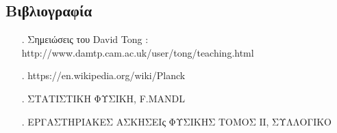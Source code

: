 \documentclass[a4paper]{article}
\begin{document}
\subsection*{Βιβλιογραφία}
\begin{itemize}
\item[.] Σημειώσεις του David Tong : http://www.damtp.cam.ac.uk/user/tong/teaching.html 
\item[.] https://en.wikipedia.org/wiki/Planck%
\item[.]  ΣΤΑΤΙΣΤΙΚΗ ΦΥΣΙΚΗ, F.MANDL
\item[.] ΕΡΓΑΣΤΗΡΙΑΚΕΣ ΑΣΚΗΣΕΙς ΦΥΣΙΚΗΣ ΤΟΜΟΣ ΙΙ, ΣΥΛΛΟΓΙΚΟ
\end{itemize}
\end{document}
